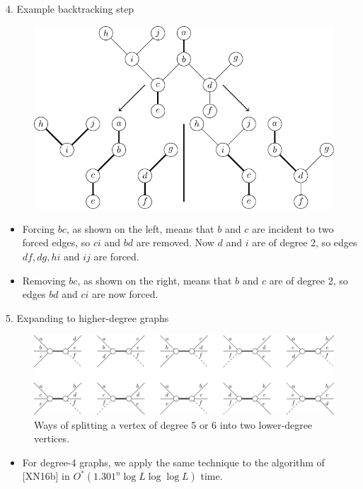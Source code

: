 \documentclass[]{templates/poster}
\begin{document}
\begin{frame}{}
\begin{columns}[t]
\begin{column}{0.422\linewidth}
  \begin{block}{4. Example backtracking step}
  \begin{figure}
  \includegraphics[width=\linewidth]{reduction}
  \end{figure}
  \begin{itemize}
  \item Forcing $bc$, as shown on the left, means that $b$ and $c$ are incident to two forced edges, so $ci$ and $bd$ are removed. Now $d$ and $i$ are of degree 2, so edges $df, dg, hi$ and $ij$ are forced.
  
  \item Removing $bc$, as shown on the right, means that $b$ and $c$ are of degree 2, so edges $bd$ and $ci$ are now forced.
  \end{itemize}
  \end{block}

  \begin{block}{\Large 5. Expanding to higher-degree graphs}
  \begin{figure}
  \includegraphics[width=\linewidth]{deg5}
  \caption{Ways of splitting a vertex of degree 5 or 6 into two lower-degree vertices.}
  \end{figure}

  \begin{itemize}
  \item For degree-4 graphs, we apply the same technique to the algorithm of [XN16b] in {\color{uobred}$O^*(1.301^n\log L \log\log L)$} time.
  

\end{itemize}
\end{block}
\end{column}
\end{columns}
\end{frame}
\end{document}
